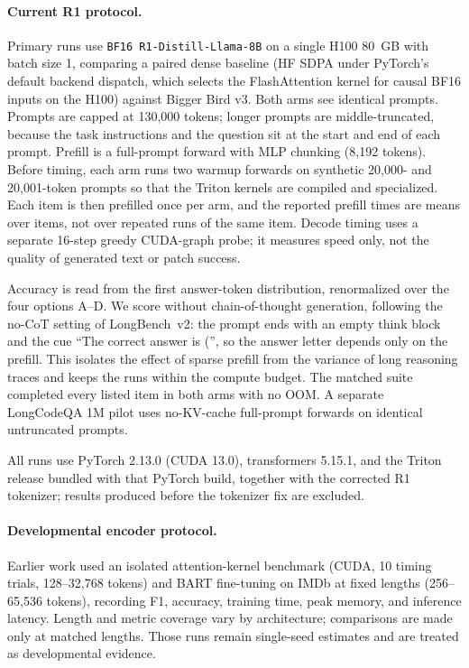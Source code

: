 \documentclass[11pt]{article}
\begin{document}
\paragraph{Current R1 protocol.}
Primary runs use \texttt{BF16 R1-Distill-Llama-8B} on a single H100 80~GB with batch
size 1, comparing a paired dense baseline (HF SDPA under PyTorch's default
backend dispatch, which selects the FlashAttention kernel for causal BF16
inputs on the H100) against Bigger Bird v3. Both arms see identical prompts.
Prompts are capped at 130{,}000 tokens; longer prompts are middle-truncated,
because the task instructions and the question sit at the start and end of
each prompt. Prefill is a full-prompt forward with MLP chunking (8{,}192
tokens). Before timing, each arm runs two warmup forwards on synthetic
20{,}000- and 20{,}001-token prompts so that the Triton kernels are compiled
and specialized. Each item is then prefilled once per arm, and the reported
prefill times are means over items, not over repeated runs of the same item.
Decode timing uses a separate 16-step greedy CUDA-graph probe; it measures
speed only, not the quality of generated text or patch success.

Accuracy is read from the first answer-token distribution, renormalized over
the four options A--D. We score without chain-of-thought generation,
following the no-CoT setting of LongBench~v2: the prompt ends with an empty
think block and the cue ``The correct answer is ('', so the answer letter
depends only on the prefill. This isolates the effect of sparse prefill from
the variance of long reasoning traces and keeps the runs within the compute
budget. The matched suite completed every listed item in both arms with no
OOM. A separate LongCodeQA 1M pilot uses no-KV-cache full-prompt forwards on
identical untruncated prompts.

All runs use PyTorch 2.13.0 (CUDA 13.0), transformers 5.15.1, and the Triton
release bundled with that PyTorch build, together with the corrected R1
tokenizer; results produced before the tokenizer fix are excluded.

\paragraph{Developmental encoder protocol.}
Earlier work used an isolated attention-kernel benchmark (CUDA, 10 timing
trials, 128--32{,}768 tokens) and BART fine-tuning on IMDb at fixed lengths
(256--65{,}536 tokens), recording F1, accuracy, training time, peak memory,
and inference latency. Length and metric coverage vary by architecture;
comparisons are made only at matched lengths. Those runs remain single-seed
estimates and are treated as developmental evidence.
\end{document}
